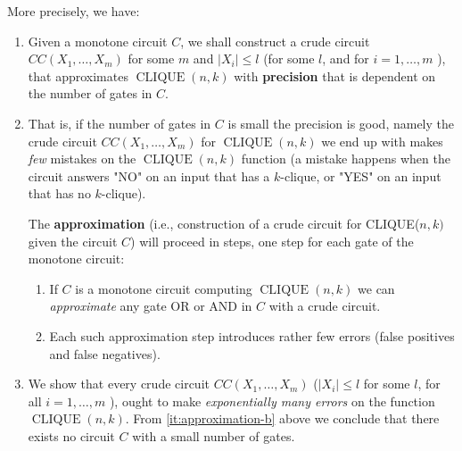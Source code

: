 More precisely, we have:  
\begin{enumerate}
 
\item  Given a monotone circuit $C$, we shall construct a crude circuit 
$CC(X_1, \ldots, X_m)$ for some $m$ and $|{X}_{i}| \leq l$ (for some $l$, and for $i=1, \ldots, m$ ), that approximates $\operatorname{CLIQUE}({n}, {k})$ with \textbf{precision} that is dependent on the number of gates in $C$.

\item That is, if the number of gates in $C$ is small the precision is  good, namely the crude circuit ${CC}(X_1, \ldots, X_m)$ for $\operatorname{CLIQUE}({n}, {k})$ we end up with makes \textit{few} mistakes on the $\operatorname{CLIQUE}({n}, {k})$ function (a mistake happens when the circuit  answers  "NO" on an input that has a $k$-clique, or "YES" on an input that has no $k$-clique).\label{it:approximation-b}

The \textbf{approximation} (i.e., construction of a crude circuit for CLIQUE(${n},{k})$ given the circuit $C$) will proceed in steps, one step for each gate of the monotone circuit:

\begin{enumerate}
    
\item If $C$ is a monotone circuit computing $\operatorname{CLIQUE}({n}, {k})$ we can \textit{approximate} any gate OR or AND in $C$ with a crude circuit.

\item Each such approximation step introduces rather few errors (false positives and false negatives).
\end{enumerate}



\item We show that every crude circuit ${CC}({X}_1, \ldots, {X_m})$ ($|{X}_i| \leq l$ for some $l$, for all $i=1, \ldots, m$ ), ought to make \textit{exponentially many errors} on the function $\operatorname{CLIQUE}(n, k)$. From \ref{it:approximation-b} above we conclude that there exists no circuit $C$ with a small number of gates. 
\end{enumerate}





